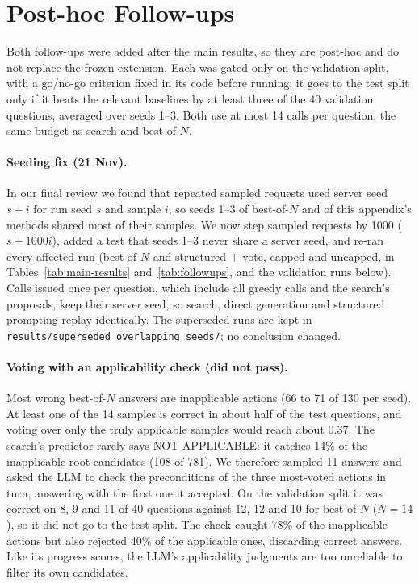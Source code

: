 \clearpage  %
\section{Post-hoc Follow-ups}
\label{app:followups}

Both follow-ups were added after the main results, so they are post-hoc and do not replace the
frozen extension. Each was gated only on the validation split, with a go/no-go criterion fixed in
its code before running: it goes to the test split only if it beats the relevant baselines by at
least three of the 40 validation questions, averaged over seeds 1--3. Both use at most 14 calls per question, the same budget as search and best-of-$N$.

\paragraph{Seeding fix (21 Nov).} In our final review we found that repeated sampled requests used server seed $s + i$ for run seed $s$ and sample $i$, so seeds 1--3 of best-of-$N$ and of this appendix's methods shared most of their samples. We now step sampled requests by 1000 ($s + 1000i$), added a test that seeds 1--3 never share a server seed, and re-ran every affected run (best-of-$N$ and structured + vote, capped and uncapped, in Tables~\ref{tab:main-results} and~\ref{tab:followups}, and the validation runs below). Calls issued once per question, which include all greedy calls and the search's proposals, keep their server seed, so search, direct generation and structured prompting replay identically. The superseded runs are kept in \texttt{results/superseded\_overlapping\_seeds/}; no conclusion changed.

\paragraph{Voting with an applicability check (did not pass).}
Most wrong best-of-$N$ answers are inapplicable actions (66 to 71 of 130 per seed). At least one of
the 14 samples is correct in about half of the test questions, and voting over only the truly
applicable samples would reach about 0.37. The search's predictor rarely says NOT APPLICABLE: it catches
14\% of the inapplicable root candidates (108 of 781). We therefore sampled 11 answers and asked the
LLM to check the preconditions of the three most-voted actions in turn, answering with the first
one it accepted. On the validation split it was correct on 8, 9 and 11 of 40 questions against 12, 12 and 10 for best-of-$N$ ($N{=}14$), so it did not go to the test split. The check caught 78\% of the inapplicable actions but also rejected 40\% of the applicable ones, discarding correct answers.
Like its progress scores, the LLM's applicability judgments are too unreliable to filter its own
candidates.

